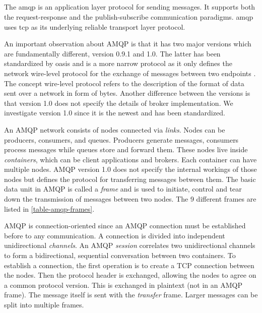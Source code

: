 \subsection{}

The \gls{amqp} is an application layer protocol for sending messages.
It supports both the request-response and the publish-subscribe communication
paradigms. \gls{amqp} uses \gls{tcp} as its underlying reliable transport layer
protocol.

An important observation about AMQP is that it has two major versions which are
fundamentally different, version 0.9.1 and 1.0. The latter has been standardized
by \gls{oasis} and is a  more narrow protocol as it only defines the network
wire-level protocol for the exchange of messages between two endpoints
\cite{oasis-amqp}. The concept wire-level protocol refers to the description of
the format of data sent over a network in form of bytes. Another difference
between the versions is that version 1.0 does not specify the details of broker
implementation. We investigate version 1.0 since it is the newest and has been
standardized.

An AMQP network consists of nodes connected via \textit{links}. Nodes can be
producers, consumers, and queues. Producers generate messages, consumers process
messages while queues store and forward them. These nodes live inside
\textit{containers}, which can be client applications and brokers. Each
container can have multiple nodes. AMQP version 1.0 does not specify the
internal workings of those nodes but defines the protocol for transferring
messages between them. The basic data unit in AMQP is called a \textit{frame}
and is used to initiate, control and tear down the transmission of messages
between two nodes. The 9 different frames are listed in
\cref{table-amqp-frames}.

AMQP is connection-oriented since an AMQP connection must be established before
to any communication. A connection is divided into independent unidirectional
\textit{channels}. An AMQP \textit{session} correlates two unidirectional
channels to form a bidirectional, sequential conversation between two
containers. To establish a connection, the first operation is to create a TCP
connection between the nodes. Then the protocol header is exchanged, allowing
the nodes to agree on a common protocol version. This is exchanged in plaintext
(not in an AMQP frame). The message itself is sent with the \textit{transfer}
frame. Larger messages can be split into multiple frames.



